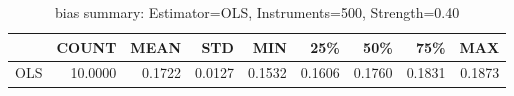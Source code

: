 \begin{table}[ht]
\centering
\caption{bias summary: Estimator=OLS, Instruments=500, Strength=0.40}
\begin{tabular}{lrrrrrrrr}
\toprule
 & COUNT & MEAN & STD & MIN & 25\% & 50\% & 75\% & MAX \\
\midrule
OLS & 10.0000 & 0.1722 & 0.0127 & 0.1532 & 0.1606 & 0.1760 & 0.1831 & 0.1873 \\
\bottomrule
\end{tabular}
\end{table}
